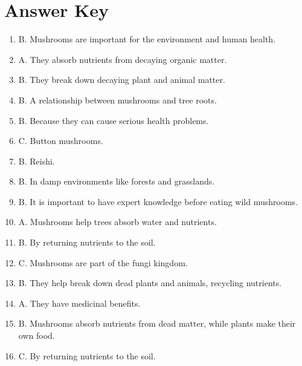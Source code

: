 \documentclass[12pt]{article}
\begin{document}
\section*{Answer Key}

\begin{enumerate}

    \item B. Mushrooms are important for the environment and human health.
    \item A. They absorb nutrients from decaying organic matter.
    \item B. They break down decaying plant and animal matter.
    \item B. A relationship between mushrooms and tree roots.
    \item B. Because they can cause serious health problems.
    \item C. Button mushrooms.
    \item B. Reishi.
    \item B. In damp environments like forests and grasslands.
    \item B. It is important to have expert knowledge before eating wild mushrooms.
    \item A. Mushrooms help trees absorb water and nutrients.
    \item B. By returning nutrients to the soil.
    \item C. Mushrooms are part of the fungi kingdom.
    \item B. They help break down dead plants and animals, recycling nutrients.
    \item A. They have medicinal benefits.
    \item B. Mushrooms absorb nutrients from dead matter, while plants make their own food.
    \item C. By returning nutrients to the soil.

\end{enumerate}
\end{document}
